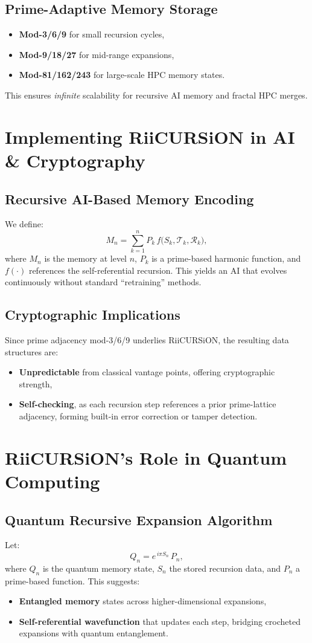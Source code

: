 \documentclass[12pt]{article}
\begin{document}
\subsection{Prime-Adaptive Memory Storage}
\begin{itemize}
\item \textbf{Mod-3/6/9} for small recursion cycles,
\item \textbf{Mod-9/18/27} for mid-range expansions,
\item \textbf{Mod-81/162/243} for large-scale HPC memory states.
\end{itemize}
This ensures \emph{infinite} scalability for recursive AI memory and fractal HPC merges.

\section{Implementing RiiCURSiON in AI \& Cryptography}
\subsection{Recursive AI-Based Memory Encoding}
We define:
\[
M_n = \sum_{k=1}^{n} P_k \, f\bigl(S_k, \mathcal{T}_k, \mathcal{R}_k\bigr),
\]
where $M_n$ is the memory at level $n$, $P_k$ is a prime-based harmonic function, and $f(\cdot)$ references the self-referential recursion. This yields an AI that evolves continuously without standard “retraining” methods.

\subsection{Cryptographic Implications}
Since prime adjacency mod-3/6/9 underlies RiiCURSiON, the resulting data structures are:
\begin{itemize}
\item \textbf{Unpredictable} from classical vantage points, offering cryptographic strength,
\item \textbf{Self-checking}, as each recursion step references a prior prime-lattice adjacency, forming built-in error correction or tamper detection.
\end{itemize}

\section{RiiCURSiON’s Role in Quantum Computing}
\subsection{Quantum Recursive Expansion Algorithm}
Let:
\[
Q_n = e^{\,i\pi S_n}\,P_n,
\]
where $Q_n$ is the quantum memory state, $S_n$ the stored recursion data, and $P_n$ a prime-based function. This suggests:
\begin{itemize}
\item \textbf{Entangled memory} states across higher-dimensional expansions,
\item \textbf{Self-referential wavefunction} that updates each step, bridging crocheted expansions with quantum entanglement.
\end{itemize}
\end{document}

